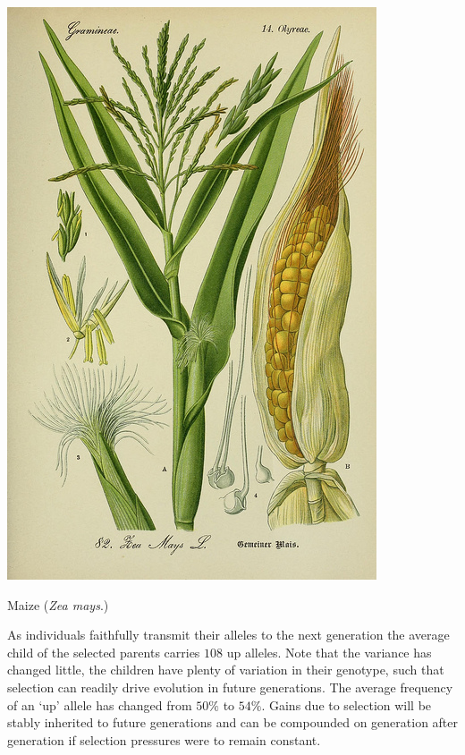  \begin{marginfigure}[4cm]
 \begin{center}
   \includegraphics[width = 0.7 \textwidth]{illustration_images/Genetic_drift/maize/7845339168_66aa3d8ccc_z.jpg}
 \end{center}
 \caption{Maize ({\it Zea mays}.) } \label{fig:maize}  %
 \end{marginfigure}  %

 As individuals
 faithfully transmit their alleles to the next generation the average
 child of the selected parents carries $108$ up alleles. Note that the
 variance has changed little, the children have plenty of variation in
 their genotype, such that selection can readily drive evolution in future generations. The average frequency of an `up' allele has changed
 from $50\%$ to $54\%$. Gains due to selection will be stably
 inherited to future generations and can be compounded on generation
 after generation if selection pressures were to remain constant.



